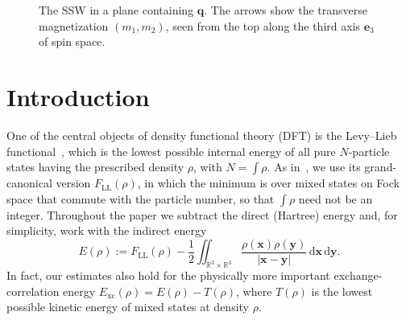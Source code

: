 \documentclass[final,reqno]{amsart}
\theoremstyle{remark}
\newcommand{\RR}{\mathbb{R}}
\newcommand{\LL}{\mathrm{LL}}
\newcommand{\xc}{\mathrm{xc}}
\newcommand{\dd}{\mathrm{d}}
\begin{document}
\begin{figure}[!b]
\centering
{}
\caption{The SSW in a plane containing $\mathbf{q}$. The arrows show the transverse magnetization $(m_1,m_2)$, seen from the top along the third axis $\mathbf{e}_3$ of spin space.}\label{fig:SSW}
\end{figure}

\clearpage
\section{Introduction}

One of the central objects of density functional theory (DFT) is the Levy--Lieb functional~\cite{levy1979universal,lieb1983density}, which is the lowest possible internal energy of all pure $N$-particle states having the prescribed density $\rho$, with $N=\int\rho$. As in~\cite{lewin2020local}, we use its grand-canonical version $F_\LL(\rho)$, in which the minimum is over mixed states on Fock space that commute with the particle number, so that $\int\rho$ need not be an integer. Throughout the paper we subtract the direct (Hartree) energy and, for simplicity, work with the indirect energy
\begin{equation}\label{eq:def_E_intro}
E(\rho):=F_\LL(\rho)-\frac{1}{2}\iint_{\RR^3\times\RR^3}\frac{\rho(\mathbf{x})\rho(\mathbf{y})}{|\mathbf{x}-\mathbf{y}|}\,\dd\mathbf{x}\,\dd\mathbf{y}.
\end{equation}
In fact, our estimates also hold for the physically more important exchange-correlation energy $E_\xc(\rho)=E(\rho)-T(\rho)$, where $T(\rho)$ is the lowest possible kinetic energy of mixed states at density $\rho$.
\end{document}
